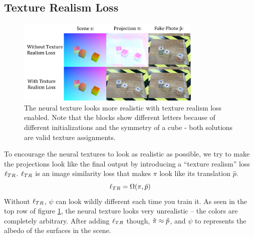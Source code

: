 \documentclass{article}
\begin{document}
	\subsection{Texture Realism Loss}
	\label{sec:texture_realism_loss}
        \vspace{-7pt}
		\begin{figure}[thbp]
			\begin{center}
				\includegraphics[width=250pt]{../images/texture_realism_ablation.pdf}
			\end{center}
			\vspace{-5pt}
			\caption{
				The neural texture looks more realistic with texture realism loss enabled. Note that the blocks show different letters because of different initializations and the symmetry of a cube - both solutions are valid texture assignments. 
			}
			\vspace{-10pt}
			\label{fig:texture_realism_ablation}
		\end{figure}



		To encourage the neural textures to look as realistic as possible, we try to make the projections look like the final output by introducing a ``texture realism'' loss $\ell_{TR}$. 
		$\ell_{TR}$ is an image similarity loss that makes $\pi$ look like its translation $\hat{p}$.
		\begin{equation}
			\ell_{TR} = \Omega(\pi,\hat{p})
		\end{equation}
		Without $\ell_{TR}$, $\psi$ can look wildly different each time you train it.
		As seen in the top row of figure \ref{fig:texture_realism_ablation}, the neural texture looks very unrealistic – the colors are completely arbitrary.
		After adding $\ell_{TR}$ though, $\hat{\pi} \approx \hat{p}$, and $\psi$ to represents the albedo of the surfaces in the scene.
		
\end{document}
